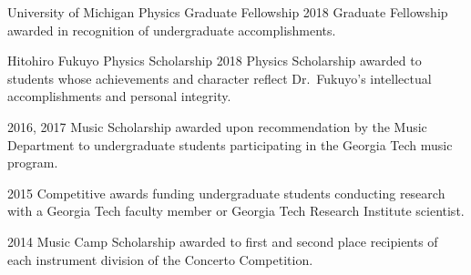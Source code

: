 
\begin{minipage}[t]{0.2\textwidth}
	\flushleft
\end{minipage}
\begin{minipage}[t]{0.8\textwidth}
	\award
  {University of Michigan Physics Graduate Fellowship}
  {2018}
  {Graduate Fellowship awarded in recognition of undergraduate accomplishments.}

  \vspace*{4pt}

	\award
  {Hitohiro Fukuyo Physics Scholarship}
  {2018}
  {Physics Scholarship awarded to students whose achievements and character reflect Dr.\ Fukuyo's intellectual accomplishments and personal integrity.}

  \vspace*{4pt}

  {2016, 2017}
  {Music Scholarship awarded upon recommendation by the Music Department to undergraduate students participating in the Georgia Tech music program.}

  \vspace*{4pt}

  {2015}
  {Competitive awards funding undergraduate students conducting research with a Georgia Tech faculty member or Georgia Tech Research Institute scientist.}
	
  \vspace*{4pt}

  {2014}
  {Music Camp Scholarship awarded to first and second place recipients of each instrument division of the Concerto Competition.}
\end{minipage}

\vspace*{8pt}

